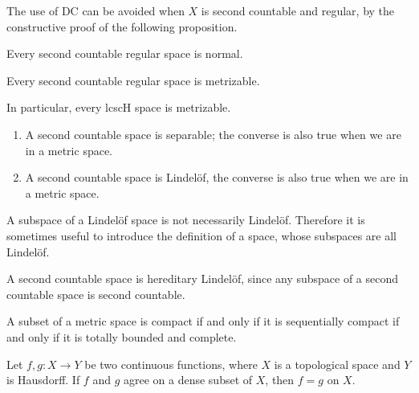 The use of \textsf{DC} can be avoided when $X$ is second countable and regular, by the constructive proof of the following proposition.

\begin{prop}
    Every second countable regular space is normal.
\end{prop}

\begin{namedthm}
    Every second countable regular space is metrizable.
\end{namedthm}

In particular, every lcscH space is metrizable.

\begin{prop} \label{prop:2nd-count-separable-lindlof} \leavevmode
    \begin{enumerate}
        \item A second countable space is separable; the converse is also true when we are in a metric space.
        \item A second countable space is Lindelöf, the converse is also true when we are in a metric space.
    \end{enumerate}
\end{prop}

A subspace of a Lindelöf space is not necessarily Lindelöf. Therefore it is sometimes useful to introduce the definition of a  space, whose subspaces are all Lindelöf.

\begin{fact} \label{fact:Lind-property-2nd-count-space}
    A second countable space is hereditary Lindelöf, since any subspace of a second countable space is second countable.
\end{fact}


\begin{thm}\label{thm:char-thm-compact}
    A subset of a metric space is compact if and only if it is sequentially compact if and only if it is totally bounded and complete.
\end{thm}

\begin{prop} \label{prop:unique-dense-subset}
    Let $f,g\colon X \to Y$ be two continuous functions, where $X$ is a topological space and $Y$ is Hausdorff. If $f$ and $g$ agree on a dense subset of $X$, then $f = g$ on $X$.
\end{prop}

